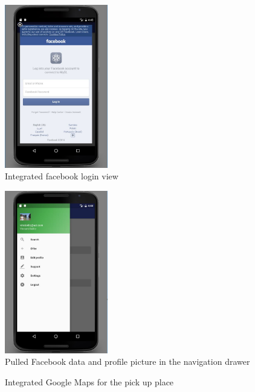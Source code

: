 \documentclass[11pt,twoside,a4paper]{report}
\begin{document}
\begin{appendices}
\begin{figure}
	\centering
	\includegraphics[width=0.4\textwidth]{jpg/facebook2.jpg}
	\caption{Integrated facebook login view}
	\label{figure:search-view}
\end{figure}

\begin{figure}
	\centering
	\includegraphics[width=0.4\textwidth]{jpg/facebook3.jpg}
	\caption{Pulled Facebook data and profile picture in the navigation drawer}
	\label{figure:specify-search-view}
\end{figure}

\begin{figure}
	\centering
	\caption{Integrated Google Maps for the pick up place}
	\label{figure:overview}
\end{figure}


\end{appendices}
\end{document}
